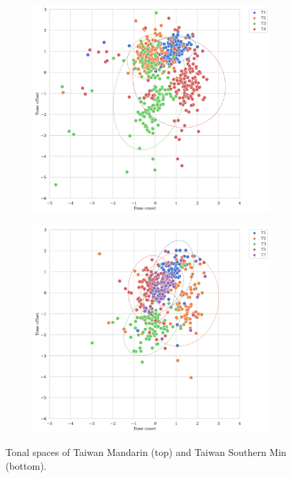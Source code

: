 \begin{figure}[hbt!]
\centering
\begin{subfigure}[b]{.8\textwidth}
\centering
\includegraphics[width=\textwidth]{Figures/Tone_space_Mandarin.png}
\end{subfigure}
\begin{subfigure}[b]{.8\textwidth}
\centering
\includegraphics[width=\textwidth]{Figures/Tone_space_Min.png}
\end{subfigure}

\caption{Tonal spaces of Taiwan Mandarin (top) and Taiwan Southern Min (bottom).}
\label{Figure:ToneSpace}
\end{figure}

